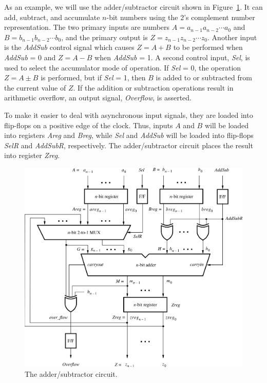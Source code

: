 \documentclass[11pt, twoside, pdftex]{article}
\begin{document}
As an example, we will use the adder/subtractor circuit shown in Figure~\ref{fig:1}.
It can add, subtract, and accumulate $n$-bit numbers 
using the 2's complement number representation. 
The two primary inputs are numbers $A = a_{n-1} a_{n-2} \cdots a_0$
and $B = b_{n-1} b_{n-2} \cdots b_0$, and the primary output
is $Z = z_{n-1} z_{n-2} \cdots z_0$. Another input is the {\it AddSub} 
control signal which causes $Z = A + B$ to be performed when {\it AddSub} = 0 
and $Z = A - B$ when {\it AddSub} = 1.
A second control input, {\it Sel}, is used to select the accumulator mode of 
operation. If {\it Sel} = 0, the operation $Z = A \pm B$ is performed, but if
{\it Sel} = 1, then $B$ is added to or subtracted from the current
value of $Z$.
If the addition or subtraction operations result in arithmetic overflow, 
an output signal, {\it Overflow}, is asserted.

To make it easier to deal with asynchronous input signals, they are loaded 
into flip-flops on a positive edge of the clock. 
Thus, inputs $A$ and $B$ will be loaded into registers
{\it Areg} and {\it Breg}, while {\it Sel} and {\it AddSub} will be loaded into
flip-flops {\it SelR} and {\it AddSubR}, respectively.
The adder/subtractor circuit places the result into register {\it Zreg}.

\begin{figure}[H]
   \begin{center}
      \includegraphics[scale=0.8]{figures/figure1.png}
   \caption{The adder/subtractor circuit.} 
	 \label{fig:1}
	 \end{center}
\end{figure} 
\end{document}
